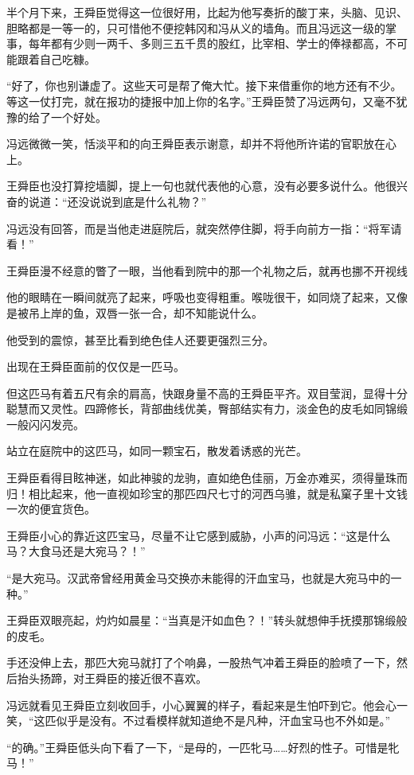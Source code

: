 半个月下来，王舜臣觉得这一位很好用，比起为他写奏折的酸丁来，头脑、见识、胆略都是一等一的，只可惜他不便挖韩冈和冯从义的墙角。而且冯远这一级的掌事，每年都有少则一两千、多则三五千贯的股红，比宰相、学士的俸禄都高，不可能跟着自己吃糠。

“好了，你也别谦虚了。这些天可是帮了俺大忙。接下来借重你的地方还有不少。等这一仗打完，就在报功的捷报中加上你的名字。”王舜臣赞了冯远两句，又毫不犹豫的给了一个好处。

冯远微微一笑，恬淡平和的向王舜臣表示谢意，却并不将他所许诺的官职放在心上。

王舜臣也没打算挖墙脚，提上一句也就代表他的心意，没有必要多说什么。他很兴奋的说道：“还没说说到底是什么礼物？”

冯远没有回答，而是当他走进庭院后，就突然停住脚，将手向前方一指：“将军请看！”

王舜臣漫不经意的瞥了一眼，当他看到院中的那一个礼物之后，就再也挪不开视线

他的眼睛在一瞬间就亮了起来，呼吸也变得粗重。喉咙很干，如同烧了起来，又像是被吊上岸的鱼，双唇一张一合，却不知能说什么。

他受到的震惊，甚至比看到绝色佳人还要更强烈三分。

出现在王舜臣面前的仅仅是一匹马。

但这匹马有着五尺有余的肩高，快跟身量不高的王舜臣平齐。双目莹润，显得十分聪慧而又灵性。四蹄修长，背部曲线优美，臀部结实有力，淡金色的皮毛如同锦缎一般闪闪发亮。

站立在庭院中的这匹马，如同一颗宝石，散发着诱惑的光芒。

王舜臣看得目眩神迷，如此神骏的龙驹，直如绝色佳丽，万金亦难买，须得量珠而归！相比起来，他一直视如珍宝的那匹四尺七寸的河西乌骓，就是私窠子里十文钱一次的便宜货色。

王舜臣小心的靠近这匹宝马，尽量不让它感到威胁，小声的问冯远：“这是什么马？大食马还是大宛马？！”

“是大宛马。汉武帝曾经用黄金马交换亦未能得的汗血宝马，也就是大宛马中的一种。”

王舜臣双眼亮起，灼灼如晨星：“当真是汗如血色？！”转头就想伸手抚摸那锦缎般的皮毛。

手还没伸上去，那匹大宛马就打了个响鼻，一股热气冲着王舜臣的脸喷了一下，然后抬头扬蹄，对王舜臣的接近很不喜欢。

冯远就看见王舜臣立刻收回手，小心翼翼的样子，看起来是生怕吓到它。他会心一笑，“这匹似乎是没有。不过看模样就知道绝不是凡种，汗血宝马也不外如是。”

“的确。”王舜臣低头向下看了一下，“是母的，一匹牝马……好烈的性子。可惜是牝马！”

